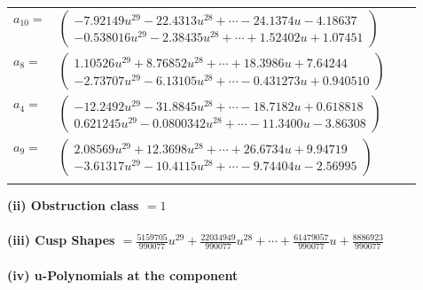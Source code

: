 \documentclass[1p]{elsarticle_modified}
\theoremstyle{definition}
\begin{document}
\begin{tabular}{m{7pt} m{180pt} m{7pt} m{180pt} }
\flushright $a_{10}=$&$\begin{pmatrix}-7.92149 u^{29}-22.4313 u^{28}+\cdots-24.1374 u-4.18637\\-0.538016 u^{29}-2.38435 u^{28}+\cdots+1.52402 u+1.07451\end{pmatrix}$ \\
\flushright $a_{8}=$&$\begin{pmatrix}1.10526 u^{29}+8.76852 u^{28}+\cdots+18.3986 u+7.64244\\-2.73707 u^{29}-6.13105 u^{28}+\cdots-0.431273 u+0.940510\end{pmatrix}$ \\
\flushright $a_{4}=$&$\begin{pmatrix}-12.2492 u^{29}-31.8845 u^{28}+\cdots-18.7182 u+0.618818\\0.621245 u^{29}-0.0800342 u^{28}+\cdots-11.3400 u-3.86308\end{pmatrix}$ \\
\flushright $a_{9}=$&$\begin{pmatrix}2.08569 u^{29}+12.3698 u^{28}+\cdots+26.6734 u+9.94719\\-3.61317 u^{29}-10.4115 u^{28}+\cdots-9.74404 u-2.56995\end{pmatrix}$\\&\end{tabular}
\flushleft \textbf{(ii) Obstruction class $= 1$}\\~\\
\flushleft \textbf{(iii) Cusp Shapes $= \frac{5159705}{990077} u^{29}+\frac{22034949}{990077} u^{28}+\cdots+\frac{61479057}{990077} u+\frac{8886923}{990077}$}\\~\\
\newpage\renewcommand{\arraystretch}{1}
\flushleft \textbf{(iv) u-Polynomials at the component}\newline \\
\end{document}
